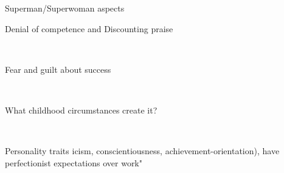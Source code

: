 \documentclass[aspectratio=169]{beamer}
\begin{document}
\begin{frame}
  \begin{center}
    \Huge Superman/Superwoman aspects

  \end{center}
\end{frame}

\begin{frame}
  \begin{center}
    \Huge Denial of competence and Discounting praise

    \\ \small \cite{sakulku11}
  \end{center}
\end{frame}

\begin{frame}
  \begin{center}
    \Huge Fear and guilt about success

    \\ \small \cite{sakulku11}
  \end{center}
\end{frame}


\begin{frame}
  \begin{center}
    \Huge What childhood circumstances create it?

    \\ \small \cite{sakulku11}
  \end{center}
\end{frame}

\begin{frame}
  \begin{center}
    \Huge Personality traits
    icism, conscientiousness, achievement-orientation), have perfectionist expectations over work"
  \end{center}
\end{frame}
\end{document}
